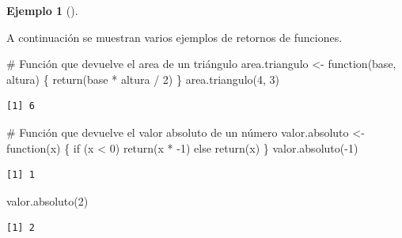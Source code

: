 \documentclass[
  a4paper,
]{scrreport}
\newenvironment{Shaded}{\begin{snugshade}}{\end{snugshade}}
\newcommand{\CommentTok}[1]{\textcolor[rgb]{0.37,0.37,0.37}{#1}}
\newcommand{\ControlFlowTok}[1]{\textcolor[rgb]{0.00,0.23,0.31}{#1}}
\newcommand{\DecValTok}[1]{\textcolor[rgb]{0.68,0.00,0.00}{#1}}
\newcommand{\FunctionTok}[1]{\textcolor[rgb]{0.28,0.35,0.67}{#1}}
\newcommand{\NormalTok}[1]{\textcolor[rgb]{0.00,0.23,0.31}{#1}}
\newcommand{\OtherTok}[1]{\textcolor[rgb]{0.00,0.23,0.31}{#1}}
\newcommand{\SpecialCharTok}[1]{\textcolor[rgb]{0.37,0.37,0.37}{#1}}
\theoremstyle{definition}
\newtheorem{example}{Ejemplo}[chapter]
\theoremstyle{definition}
\theoremstyle{remark}
\begin{document}
\leavevmode{}%
\begin{example}[]\label{exm-retorno-funciones}

A continuación se muestran varios ejemplos de retornos de funciones.

\begin{Shaded}
\begin{Highlighting}[]
\CommentTok{\# Función que devuelve el area de un triángulo}
\NormalTok{area.triangulo }\OtherTok{\textless{}{-}} \ControlFlowTok{function}\NormalTok{(base, altura) \{}
  \FunctionTok{return}\NormalTok{(base }\SpecialCharTok{*}\NormalTok{ altura }\SpecialCharTok{/} \DecValTok{2}\NormalTok{)}
\NormalTok{\}}
\FunctionTok{area.triangulo}\NormalTok{(}\DecValTok{4}\NormalTok{, }\DecValTok{3}\NormalTok{)}
\end{Highlighting}
\end{Shaded}

\begin{verbatim}
[1] 6
\end{verbatim}

\begin{Shaded}
\begin{Highlighting}[]
\CommentTok{\# Función que devuelve el valor absoluto de un número}
\NormalTok{valor.absoluto }\OtherTok{\textless{}{-}} \ControlFlowTok{function}\NormalTok{(x) \{}
  \ControlFlowTok{if}\NormalTok{ (x }\SpecialCharTok{\textless{}} \DecValTok{0}\NormalTok{)}
    \FunctionTok{return}\NormalTok{(x }\SpecialCharTok{*} \SpecialCharTok{{-}}\DecValTok{1}\NormalTok{)}
  \ControlFlowTok{else}
    \FunctionTok{return}\NormalTok{(x)}
\NormalTok{\}}
\FunctionTok{valor.absoluto}\NormalTok{(}\SpecialCharTok{{-}}\DecValTok{1}\NormalTok{)}
\end{Highlighting}
\end{Shaded}

\begin{verbatim}
[1] 1
\end{verbatim}

\begin{Shaded}
\begin{Highlighting}[]
\FunctionTok{valor.absoluto}\NormalTok{(}\DecValTok{2}\NormalTok{)}
\end{Highlighting}
\end{Shaded}

\begin{verbatim}
[1] 2
\end{verbatim}

\end{example}
\end{document}
